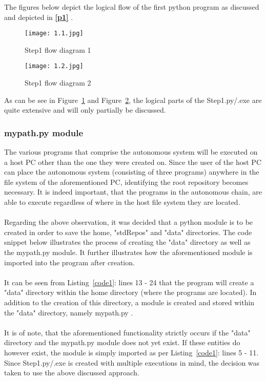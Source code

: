 The figures below depict the logical flow of the first python program as discussed and depicted in \textbf{\ref{p1} }. 
\begin{figure}[H]
\begin{center}
\texttt{[image: 1.1.jpg]}
\caption{Step1 flow diagram 1}
\label{1.1}
\end{center}
\end{figure}

\begin{figure}[H]
\begin{center}
\texttt{[image: 1.2.jpg]}
\caption{Step1 flow diagram 2}
\label{1.2}
\end{center}
\end{figure}

As can be see in Figure~\ref{1.1} and Figure~\ref{1.2}, the logical parts of the Step1.py/.exe are quite extensive and will only partially be discussed. 

\subsubsection{mypath.py module}
\label{mypath}

The various programs that comprise the autonomous system will be executed on a host PC other than the one they were created on. Since the user of the host PC can place the autonomous system (consisting of three programs) anywhere in the file system of the aforementioned PC, identifying the root repository becomes necessary. It is indeed important, that the programs in the autonomous chain, are able to execute regardless of where in the host file system they are located. 
\\\\
Regarding the above observation, it was decided that a python module is to be created in order to save the home, "stdRepos" and "data" directories. The code snippet below illustrates the process of creating the "data" directory as well as the mypath.py module. It further illustrates how the aforementioned module is imported into the program after creation.
\\\\


It can be seen from Listing~\ref{code1}: lines 13 - 24 that the program will create a "data" directory within the home directory (where the programs are located). In addition to the creation of this directory, a module is created and stored within the "data" directory, namely mypath.py \cite{Sweigart2015}.
\\\\
It is of note, that the aforementioned functionality strictly occurs if the "data" directory and the mypath.py module does not yet exist. If these entities do however exist, the module is simply imported as per  Listing~\ref{code1}: lines 5 - 11. Since Step1.py/.exe is created with multiple executions in mind, the decision was taken to use the above discussed approach.

